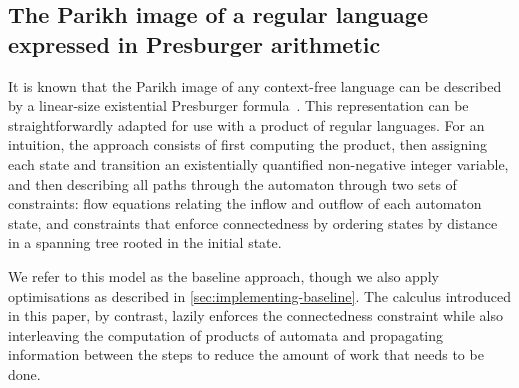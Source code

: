 \subsection{The Parikh image of a regular language expressed in Presburger arithmetic}
\label{sec:verma}

It is known that the Parikh image of any context-free language can be
described by a linear-size existential Presburger
formula~\cite{generate-parikh-image}. This representation can be
straightforwardly adapted for use with a product of regular
languages. For an intuition, the approach consists of first computing
the product, then assigning each state and transition an existentially
quantified non-negative integer variable, and then describing all
paths through the automaton through two sets of constraints: flow
equations relating the inflow and outflow of each automaton state, and
constraints that enforce connectedness by ordering states by distance
in a spanning tree rooted in the initial state.

We refer to this model as the baseline approach, though we also apply
optimisations as described in \cref{sec:implementing-baseline}. The calculus
introduced in this paper, by contrast, lazily enforces the connectedness
constraint while also interleaving the computation of products of automata and
propagating information between the steps to reduce the amount of work that
needs to be done.

